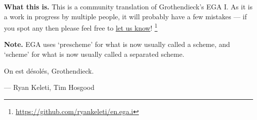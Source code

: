 \textbf{What this is.}
    This is a community translation of Grothendieck's EGA I.
    As it is a work in progress by multiple people, it will probably have a few
    mistakes --- if you spot any then please feel free to
    \href{https://github.com/ryankeleti/en.ega.i/issues}{let us know}!
    \thanks{\url{https://github.com/ryankeleti/en.ega.i}}

\noindent
    \textbf{Note.} EGA uses `prescheme' for what is now usually called
    a scheme, and `scheme' for what is now usually called a
    separated scheme.
 
    On est d{\'e}sol{\'e}s, Grothendieck.

    --- Ryan Keleti, Tim Hosgood


